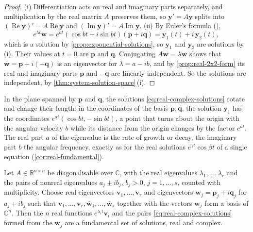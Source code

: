 \begin{proof}
(i) Differentiation acts on real and imaginary parts separately, and multiplication by the real matrix $A$ preserves them, so $\mathbf y'=A\mathbf y$ splits into $(\operatorname{Re}\mathbf y)'=A\operatorname{Re}\mathbf y$ and $(\operatorname{Im}\mathbf y)'=A\operatorname{Im}\mathbf y$. (ii) By Euler's formula (),
\[
e^{\lambda t}\mathbf w=e^{at}(\cos bt+i\sin bt)(\mathbf p+i\mathbf q)=\mathbf y_1(t)+i\,\mathbf y_2(t),
\]
which is a solution by \cref{prop:exponential-solutions}, so $\mathbf y_1$ and $\mathbf y_2$ are solutions by (i). Their values at $t=0$ are $\mathbf p$ and $\mathbf q$. Conjugating $A\mathbf w=\lambda\mathbf w$ shows that $\bar{\mathbf w}=\mathbf p+i(-\mathbf q)$ is an eigenvector for $\bar\lambda=a-ib$, and by \cref{prop:real-2x2-form} its real and imaginary parts $\mathbf p$ and $-\mathbf q$ are linearly independent. So the solutions are independent, by \cref{thm:system-solution-space}\,(i).
\end{proof}

In the plane spanned by $\mathbf p$ and $\mathbf q$, the solutions \eqref{eq:real-complex-solutions} rotate and change their length: in the coordinates of the basis $\mathbf p,\mathbf q$, the solution $\mathbf y_1$ has the coordinates $e^{at}(\cos bt,-\sin bt)$, a point that turns about the origin with the angular velocity $b$ while its distance from the origin changes by the factor $e^{at}$. The real part $a$ of the eigenvalue is the rate of growth or decay, the imaginary part $b$ the angular frequency, exactly as for the real solutions $e^{\gamma t}\cos\beta t$ of a single equation (\cref{cor:real-fundamental}).

\begin{corollary}
\label{cor:real-fundamental-system}
Let $A\in\mathbb R^{n\times n}$ be diagonalisable over $\mathbb C$, with the real eigenvalues $\lambda_1,\ldots,\lambda_r$ and the pairs of nonreal eigenvalues $a_j\pm ib_j$, $b_j>0$, $j=1,\ldots,s$, counted with multiplicity. Choose real eigenvectors $\mathbf v_1,\ldots,\mathbf v_r$ and eigenvectors $\mathbf w_j=\mathbf p_j+i\mathbf q_j$ for $a_j+ib_j$ such that $\mathbf v_1,\ldots,\mathbf v_r,\bar{\mathbf w}_1,\ldots,\bar{\mathbf w}_s$ together with the vectors $\mathbf w_j$ form a basis of $\mathbb C^n$. Then the $n$ real functions $e^{\lambda_it}\mathbf v_i$ and the pairs \eqref{eq:real-complex-solutions} formed from the $\mathbf w_j$ are a fundamental set of solutions, real and complex.
\end{corollary}

